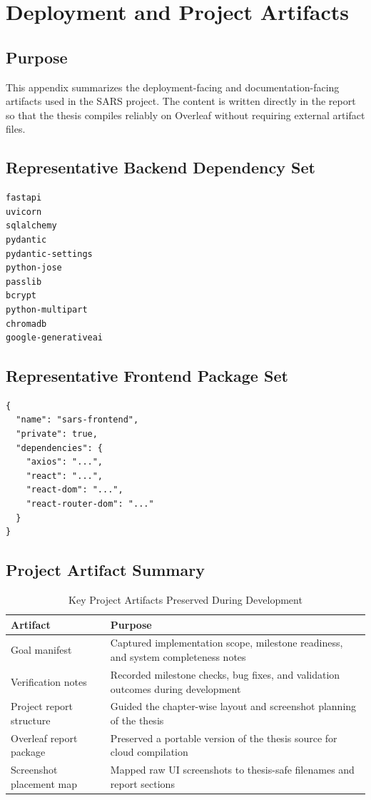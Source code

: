 \chapter{Deployment and Project Artifacts}

\section{Purpose}
This appendix summarizes the deployment-facing and documentation-facing artifacts used in the SARS project. The content is written directly in the report so that the thesis compiles reliably on Overleaf without requiring external artifact files.

\section{Representative Backend Dependency Set}
\begin{lstlisting}[style=sarscode,caption={Representative backend dependency declaration excerpt}]
fastapi
uvicorn
sqlalchemy
pydantic
pydantic-settings
python-jose
passlib
bcrypt
python-multipart
chromadb
google-generativeai
\end{lstlisting}

\section{Representative Frontend Package Set}
\begin{lstlisting}[style=sarscode,caption={Representative frontend package declaration excerpt}]
{
  "name": "sars-frontend",
  "private": true,
  "dependencies": {
    "axios": "...",
    "react": "...",
    "react-dom": "...",
    "react-router-dom": "..."
  }
}
\end{lstlisting}

\section{Project Artifact Summary}
\begin{table}[H]
\centering
\caption{Key Project Artifacts Preserved During Development}
\begin{tabularx}{\textwidth}{>{\raggedright\arraybackslash}p{} >{\raggedright\arraybackslash}X}
\toprule
\textbf{Artifact} & \textbf{Purpose} \\
\midrule
Goal manifest & Captured implementation scope, milestone readiness, and system completeness notes \\
Verification notes & Recorded milestone checks, bug fixes, and validation outcomes during development \\
Project report structure & Guided the chapter-wise layout and screenshot planning of the thesis \\
Overleaf report package & Preserved a portable version of the thesis source for cloud compilation \\
Screenshot placement map & Mapped raw UI screenshots to thesis-safe filenames and report sections \\
\bottomrule
\end{tabularx}
\end{table}

